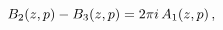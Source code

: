 \[\mathop{B_{2}\/}\nolimits\!\left(z,p\right)-\mathop{B_{3}\/}\nolimits\!\left(z%
,p\right)=2\pi i\mathop{A_{1}\/}\nolimits\!\left(z,p\right),\]